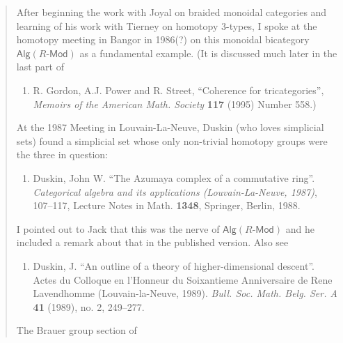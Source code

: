 \documentclass{article}
\def\tightlist{}
\renewcommand{\texttt}[1]{%
  \begingroup
  \ttfamily
  \begingroup\lccode`~=`/\lowercase{\endgroup\def~}{/\discretionary{}{}{}}%
  \begingroup\lccode`~=`[\lowercase{\endgroup\def~}{[\discretionary{}{}{}}%
  \begingroup\lccode`~=`.\lowercase{\endgroup\def~}{.\discretionary{}{}{}}%
  \catcode`/=\active\catcode`[=\active\catcode`.=\active
  \scantokens{#1\noexpand}%
  \endgroup
}
\begin{document}
\begin{quote}
After beginning the work with Joyal on braided monoidal categories and
learning of his work with Tierney on homotopy \(3\)-types, I spoke at
the homotopy meeting in Bangor in 1986(?) on this monoidal bicategory
$\mathsf{Alg}(\mbox{$R$-$\mathsf{Mod}$})$ as a fundamental example.
(It is discussed much later in the last part of

\begin{enumerate}
\def\labelenumi{\arabic{enumi})}
\setcounter{enumi}{39}
\tightlist
\item
  R. Gordon, A.J. Power and R. Street, ``Coherence for tricategories'',
  \emph{Memoirs of the American Math. Society} \textbf{117} (1995)
  Number 558.)
\end{enumerate}

At the 1987 Meeting in Louvain-La-Neuve, Duskin (who loves simplicial
sets) found a simplicial set whose only non-trivial homotopy groups were
the three in question:

\begin{enumerate}
\def\labelenumi{\arabic{enumi})}
\setcounter{enumi}{40}
\tightlist
\item
  Duskin, John W. ``The Azumaya complex of a commutative ring''.
  \emph{Categorical algebra and its applications (Louvain-La-Neuve,
  1987)}, 107--117, Lecture Notes in Math. \textbf{1348}, Springer,
  Berlin, 1988.
\end{enumerate}

I pointed out to Jack that this was the nerve of
$\mathsf{Alg}(\mbox{$R$-$\mathsf{Mod}$})$ and he included a remark
about that in the published version. Also see

\begin{enumerate}
\def\labelenumi{\arabic{enumi})}
\setcounter{enumi}{41}
\tightlist
\item
  Duskin, J. ``An outline of a theory of higher-dimensional descent''.
  Actes du Colloque en l'Honneur du Soixantieme Anniversaire de Rene
  Lavendhomme (Louvain-la-Neuve, 1989). \emph{Bull. Soc. Math. Belg.
  Ser. A} \textbf{41} (1989), no. 2, 249--277.
\end{enumerate}

The Brauer group section of



\end{quote}
\end{document}
